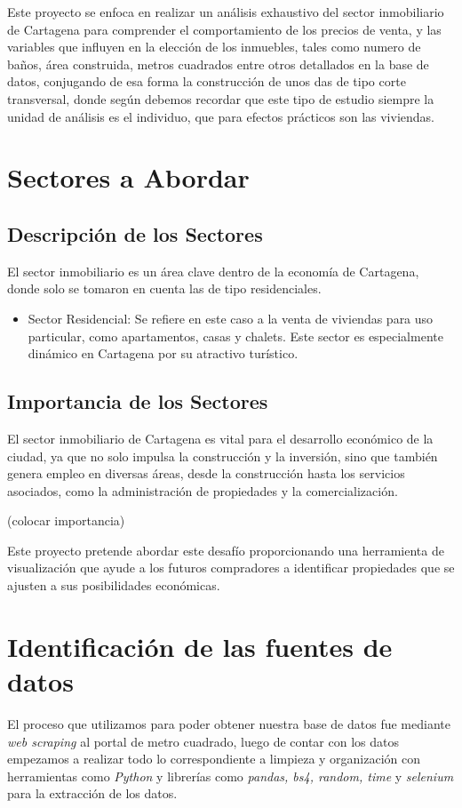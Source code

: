 \documentclass[12pt,a4paper]{article}
\begin{document}
Este proyecto se enfoca en realizar un análisis exhaustivo del sector inmobiliario de Cartagena para comprender el comportamiento de los precios de venta, y las variables que influyen en la elección de los inmuebles, tales como numero de baños, área construida, metros cuadrados entre otros detallados en la base de datos, conjugando de esa forma la construcción de unos das de tipo corte transversal, donde según \citep{rodriguez2018diseno} debemos recordar que este tipo de estudio siempre la unidad de análisis es el individuo, que para efectos prácticos son las viviendas.



\section{Sectores a Abordar}
\subsection{Descripción de los Sectores}
El sector inmobiliario es un área clave dentro de la economía de Cartagena, donde solo se tomaron en cuenta las de tipo residenciales.
\begin{itemize}
	\item Sector Residencial: Se refiere en este caso a la venta de viviendas para uso particular, como apartamentos, casas y chalets. Este sector es especialmente dinámico en Cartagena por su atractivo turístico.
\end{itemize} 

\subsection{Importancia de los Sectores}
El sector inmobiliario de Cartagena es vital para el desarrollo económico de la ciudad, ya que no solo impulsa la construcción y la inversión, sino que también genera empleo en diversas áreas, desde la construcción hasta los servicios asociados, como la administración de propiedades y la comercialización.

(colocar importancia)

Este proyecto pretende abordar este desafío proporcionando una herramienta de visualización que ayude a los futuros compradores a identificar propiedades que se ajusten a sus posibilidades económicas.
\section{Identificación de las fuentes de datos}
El proceso que utilizamos para poder obtener nuestra base de datos fue mediante \textit{web scraping} al portal de metro cuadrado, luego de contar con los datos empezamos a realizar todo lo correspondiente a limpieza y organización con herramientas como \textit{Python} y librerías como \textit{pandas, bs4, random, time} y \textit{selenium} para la extracción de los datos.
\end{document}
